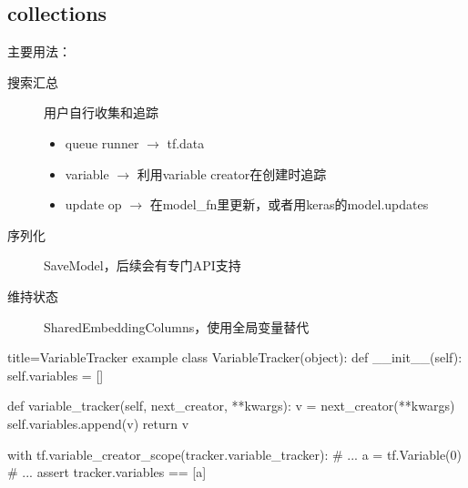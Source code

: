 
\subsection{collections}

\begin{frame}
    主要用法：
    \begin{description}
        \item[搜索汇总]  用户自行收集和追踪
            \begin{itemize}
                \item queue runner $\to$ tf.data
                \item variable $\to$ 利用variable creator在创建时追踪
                \item update op $\to$ 在model\_fn里更新，或者用keras的model.updates
            \end{itemize}
        \item[序列化]    SaveModel，后续会有专门API支持
        \item[维持状态]  SharedEmbeddingColumns，使用全局变量替代
    \end{description}
\end{frame}

\begin{frame}[fragile]
    \begin{tcblisting}{title=VariableTracker example}
            class VariableTracker(object):
              def __init__(self):
                self.variables = []

              def variable_tracker(self, next_creator, **kwargs):
                v = next_creator(**kwargs)
                self.variables.append(v)
                return v

            with tf.variable_creator_scope(tracker.variable_tracker):
              # ...
              a = tf.Variable(0)
              # ...
            assert tracker.variables == [a]
    \end{tcblisting}
\end{frame}
